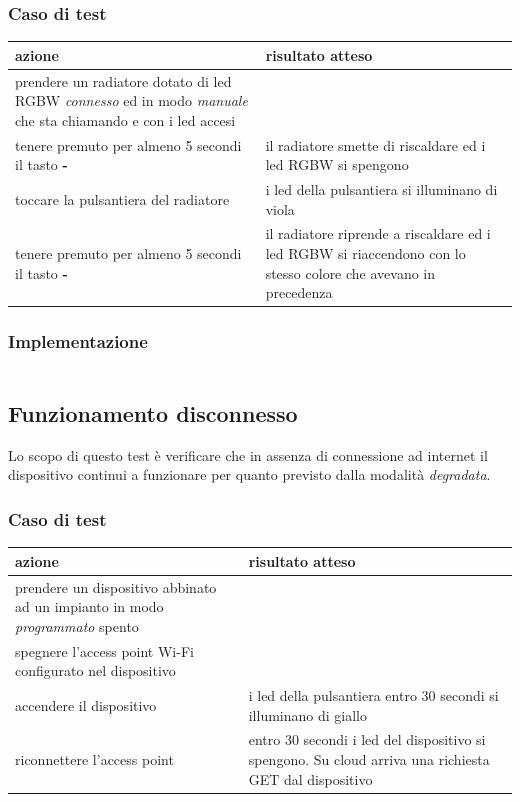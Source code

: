 \documentclass[12pt,a4paper,twoside,titlepage]{book}
\begin{document}
\subsubsection{Caso di test}
\begin{center}
\begin{tabular}{| p{} | p{} |}
    \hline \textbf{azione} & \textbf{risultato atteso} \\
    \hline prendere un radiatore dotato di \acrshort{led} RGBW \textit{connesso} ed in modo \textit{manuale} che sta chiamando e con i \acrshort{led} accesi & \\
    \hline tenere premuto per almeno 5 secondi il tasto \textbf{-} & il radiatore smette di riscaldare ed i \acrshort{led} RGBW si spengono \\
    \hline toccare la pulsantiera del radiatore & i \acrshort{led} della pulsantiera si illuminano di viola \\
    \hline tenere premuto per almeno 5 secondi il tasto \textbf{-} & il radiatore riprende a riscaldare ed i \acrshort{led} RGBW si riaccendono con lo stesso colore che avevano in precedenza \\
    \hline
\end{tabular}
\end{center}

\subsubsection{Implementazione}
\inputminted{python3}{src/test_standby.py}

\subsection{Funzionamento disconnesso}
\label{section:test_offline_working}

Lo scopo di questo test è verificare che in assenza di connessione ad internet il
dispositivo continui a funzionare per quanto previsto dalla modalità \textit{degradata}.

\subsubsection{Caso di test}
\begin{center}
\begin{tabular}{| p{} | p{} |}
    \hline \textbf{azione} & \textbf{risultato atteso} \\
    \hline prendere un dispositivo abbinato ad un impianto in modo \textit{programmato} spento & \\
    \hline spegnere l'access point Wi-Fi configurato nel dispositivo & \\
    \hline accendere il dispositivo & i \acrshort{led} della pulsantiera entro 30 secondi si illuminano di giallo \\
    \hline riconnettere l'access point & entro 30 secondi i \acrshort{led} del dispositivo si spengono. Su cloud arriva una richiesta GET dal dispositivo \\
    \hline
\end{tabular}
\end{center}
\end{document}
